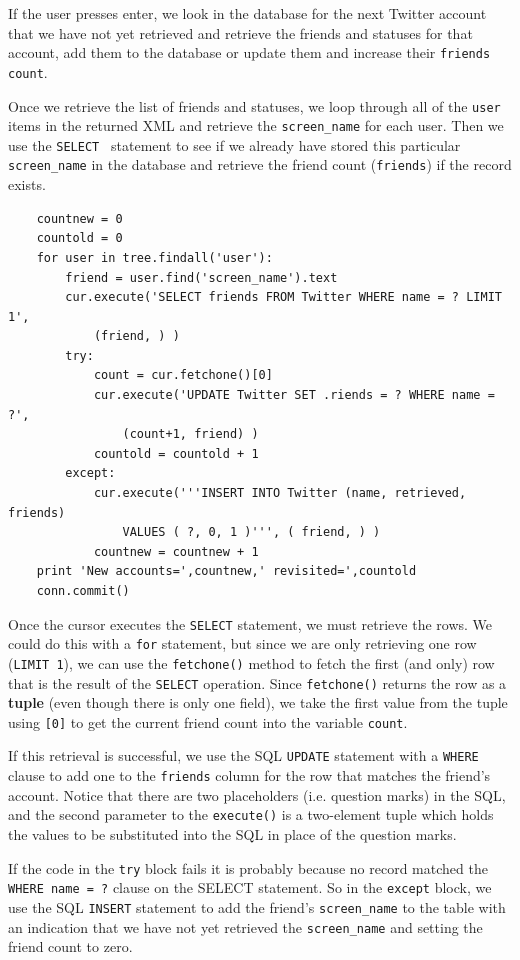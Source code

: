 \documentclass[10pt]{book}
\begin{document}
If the user presses enter, we look in the database for the next 
Twitter account that we have not yet retrieved and retrieve the
friends and statuses for that account, add them to the database 
or update them and increase their {\tt friends count}.

Once we retrieve the list of friends and statuses, we loop 
through all of the {\tt user} items in the returned XML
and retrieve the \verb"screen_name" for each user.  Then we use
the {\tt SELECT } statement to see if we already have stored this
particular \verb"screen_name" in the database and retrieve the
friend count ({\tt friends}) if the record exists.

\beforeverb
\begin{verbatim}
    countnew = 0
    countold = 0
    for user in tree.findall('user'):
        friend = user.find('screen_name').text
        cur.execute('SELECT friends FROM Twitter WHERE name = ? LIMIT 1', 
            (friend, ) )
        try:
            count = cur.fetchone()[0]
            cur.execute('UPDATE Twitter SET .riends = ? WHERE name = ?', 
                (count+1, friend) )
            countold = countold + 1
        except:
            cur.execute('''INSERT INTO Twitter (name, retrieved, friends) 
                VALUES ( ?, 0, 1 )''', ( friend, ) )
            countnew = countnew + 1
    print 'New accounts=',countnew,' revisited=',countold
    conn.commit()
\end{verbatim}
\afterverb
%
Once the cursor executes the {\tt SELECT} statement, 
we must retrieve the rows.  We could do this with a {\tt for} 
statement, but since we are only retrieving
one row ({\tt LIMIT 1}), we can use the {\tt fetchone()} method to fetch the
first (and only) row that is the result of the {\tt SELECT} operation.  
Since {\tt fetchone()} returns the row as a {\bf tuple} (even though there is only
one field), we take the first value from the tuple using {\tt [0]} to get the 
current friend count into the variable {\tt count}.  

If this retrieval is successful, we use the SQL {\tt UPDATE} statement with a 
{\tt WHERE} clause to add one to the {\tt friends} column for the row that 
matches the friend's account.  Notice that there are two placeholders (i.e.
question marks) in the SQL, and the second parameter to the {\tt execute()} is
a two-element tuple which holds the values to be substituted into the SQL
in place of the question marks.

If the code in the {\tt try} block fails it is probably because no record
matched the {\tt WHERE name = ?} clause on the SELECT statement.  So in the
{\tt except} block, we use the SQL {\tt INSERT} statement to add the friend's
\verb"screen_name" to the table with an indication that we have not yet 
retrieved the \verb"screen_name" and setting the friend count to zero.
\end{document}
